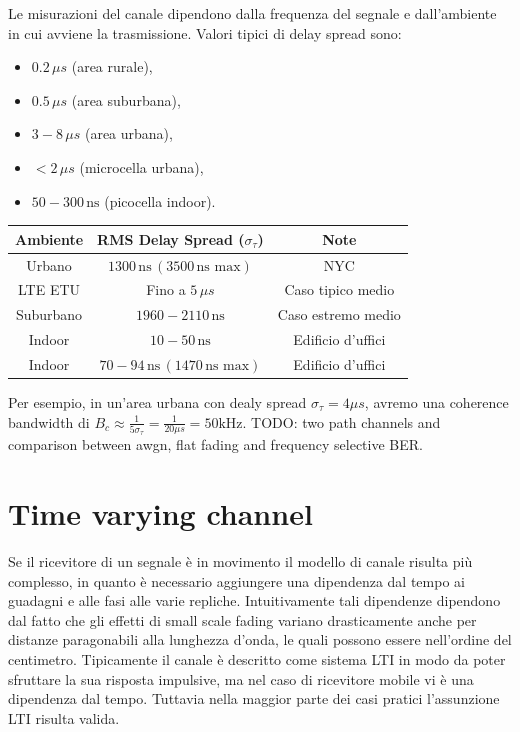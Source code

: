 Le misurazioni del canale dipendono dalla frequenza del segnale e dall'ambiente in cui avviene la trasmissione.
Valori tipici di delay spread sono:

\begin{itemize}
    \item $0.2 \, \mu s$ (area rurale),
    \item $0.5 \, \mu s$ (area suburbana),
    \item $3-8 \, \mu s$ (area urbana),
    \item $<2 \, \mu s$ (microcella urbana),
    \item $50-300 \, \text{ns}$ (picocella indoor).
\end{itemize}

\begin{center}
    \begin{tabular}{|c|c|c|}
        \hline
        \textbf{Ambiente} & \textbf{RMS Delay Spread ($\sigma_\tau$)}       & \textbf{Note}      \\
        \hline
        Urbano            & $1300 \, \text{ns} \, (3500 \, \text{ns max})$  & NYC                \\
        LTE ETU           & Fino a $5 \, \mu s$                             & Caso tipico medio  \\
        Suburbano         & $1960-2110 \, \text{ns}$                        & Caso estremo medio \\
        Indoor            & $10-50 \, \text{ns}$                            & Edificio d'uffici  \\
        Indoor            & $70-94 \, \text{ns} \, (1470 \, \text{ns max})$ & Edificio d'uffici  \\
        \hline
    \end{tabular}
\end{center}


Per esempio, in un'area urbana con dealy spread $\sigma_\tau = 4 \mu s$, avremo una coherence bandwidth di $B_c \approx \frac{1}{5 \sigma_\tau} = \frac{1}{20 \mu s} = 50 \text{kHz}$.
TODO: two path channels and comparison between awgn, flat fading and frequency selective BER.

\section*{Time varying channel}
Se il ricevitore di un segnale è in movimento il modello di canale risulta più complesso, in quanto è necessario aggiungere una dipendenza dal tempo ai guadagni e alle fasi alle varie repliche.
Intuitivamente tali dipendenze dipendono dal fatto che gli effetti di small scale fading variano drasticamente anche per distanze paragonabili alla lunghezza d'onda, le quali possono essere nell'ordine del centimetro.
Tipicamente il canale è descritto come sistema LTI in modo da poter sfruttare la sua risposta impulsive, ma nel caso di ricevitore mobile vi è una dipendenza dal tempo.
Tuttavia nella maggior parte dei casi pratici l'assunzione LTI risulta valida.

